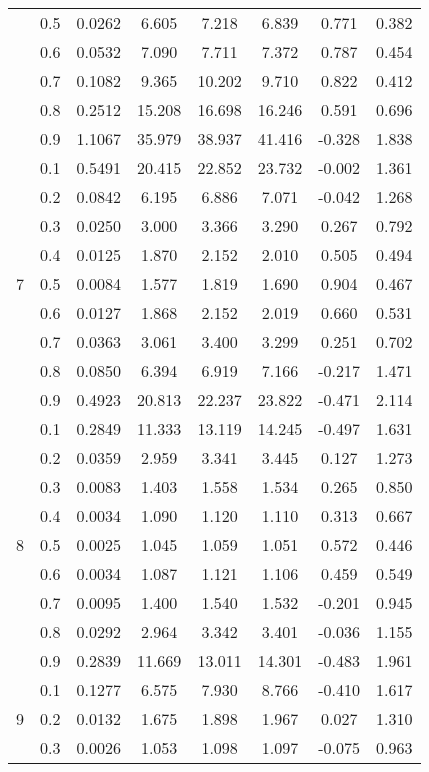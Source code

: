 \documentclass[11pt,a4paper]{report}
\begin{document}
\begin{longtable}{ | c | c || c | c | c | c | c | c | }
 & 0.5 & 0.0262 & 6.605 & 7.218 & 6.839 & 0.771 & 0.382 \\
 & 0.6 & 0.0532 & 7.090 & 7.711 & 7.372 & 0.787 & 0.454 \\
 & 0.7 & 0.1082 & 9.365 & 10.202 & 9.710 & 0.822 & 0.412 \\
 & 0.8 & 0.2512 & 15.208 & 16.698 & 16.246 & 0.591 & 0.696 \\
 & 0.9 & 1.1067 & 35.979 & 38.937 & 41.416 & -0.328 & 1.838 \\
 \hline
\multirow{9}{*}{7} & 0.1 & 0.5491 & 20.415 & 22.852 & 23.732 & -0.002 & 1.361 \\
 & 0.2 & 0.0842 & 6.195 & 6.886 & 7.071 & -0.042 & 1.268 \\
 & 0.3 & 0.0250 & 3.000 & 3.366 & 3.290 & 0.267 & 0.792 \\
 & 0.4 & 0.0125 & 1.870 & 2.152 & 2.010 & 0.505 & 0.494 \\
 & 0.5 & 0.0084 & 1.577 & 1.819 & 1.690 & 0.904 & 0.467 \\
 & 0.6 & 0.0127 & 1.868 & 2.152 & 2.019 & 0.660 & 0.531 \\
 & 0.7 & 0.0363 & 3.061 & 3.400 & 3.299 & 0.251 & 0.702 \\
 & 0.8 & 0.0850 & 6.394 & 6.919 & 7.166 & -0.217 & 1.471 \\
 & 0.9 & 0.4923 & 20.813 & 22.237 & 23.822 & -0.471 & 2.114 \\
 \hline
\multirow{9}{*}{8} & 0.1 & 0.2849 & 11.333 & 13.119 & 14.245 & -0.497 & 1.631 \\
 & 0.2 & 0.0359 & 2.959 & 3.341 & 3.445 & 0.127 & 1.273 \\
 & 0.3 & 0.0083 & 1.403 & 1.558 & 1.534 & 0.265 & 0.850 \\
 & 0.4 & 0.0034 & 1.090 & 1.120 & 1.110 & 0.313 & 0.667 \\
 & 0.5 & 0.0025 & 1.045 & 1.059 & 1.051 & 0.572 & 0.446 \\
 & 0.6 & 0.0034 & 1.087 & 1.121 & 1.106 & 0.459 & 0.549 \\
 & 0.7 & 0.0095 & 1.400 & 1.540 & 1.532 & -0.201 & 0.945 \\
 & 0.8 & 0.0292 & 2.964 & 3.342 & 3.401 & -0.036 & 1.155 \\
 & 0.9 & 0.2839 & 11.669 & 13.011 & 14.301 & -0.483 & 1.961 \\
 \hline
\multirow{9}{*}{9} & 0.1 & 0.1277 & 6.575 & 7.930 & 8.766 & -0.410 & 1.617 \\
 & 0.2 & 0.0132 & 1.675 & 1.898 & 1.967 & 0.027 & 1.310 \\
 & 0.3 & 0.0026 & 1.053 & 1.098 & 1.097 & -0.075 & 0.963 \\

\end{longtable}
\end{document}
